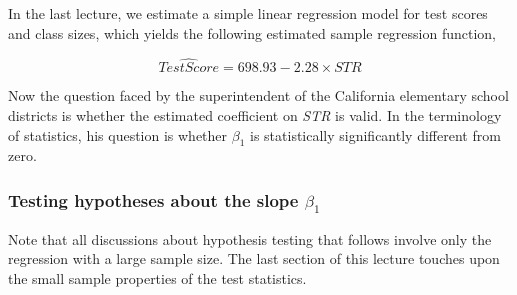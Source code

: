 \documentclass[a4paper,11pt]{article}
\begin{document}
In the last lecture, we estimate a simple linear regression model for test
scores and class sizes, which yields the following estimated sample
regression function,

\begin{equation}
\label{eq:testscr-str-1e}
\widehat{TestScore} = 698.93 - 2.28 \times STR
\end{equation}

Now the question faced by the superintendent of the California
elementary school districts is whether the estimated coefficient on
\emph{STR} is valid. In the terminology of statistics, his question is
whether \(\beta_1\) is statistically significantly different from zero. 

\subsubsection*{Testing hypotheses about the slope \(\beta_1\)}
\label{sec:org3bb4787}

Note that all discussions about hypothesis testing that
follows involve only the regression with a large sample size. The
last section of this lecture touches upon the small sample properties
of the test statistics.
\end{document}
